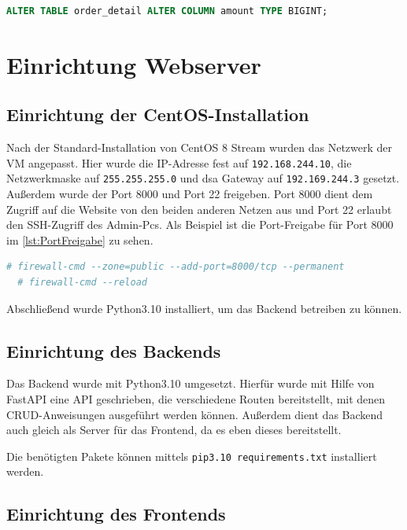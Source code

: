 \documentclass[a4paper,
    11pt,
    headings=small,
    ngerman,
    listof=totoc,
    numbers=noenddot]{scrreprt}[2021/11/13]
\begin{document}
\begin{lstlisting}[language=SQL,caption={Ändern der tickets-Tabelle},label={lst:AlterSQL}]
  ALTER TABLE order_detail ALTER COLUMN amount TYPE BIGINT;
\end{lstlisting}



\newpage
\section{Einrichtung Webserver}


\subsection{Einrichtung der CentOS-Installation}

Nach der Standard-Installation von CentOS 8 Stream wurden das Netzwerk der \ac{VM} angepasst. Hier wurde die IP-Adresse fest auf \texttt{192.168.244.10}, die Netzwerkmaske auf \texttt{255.255.255.0} und dsa Gateway auf \texttt{192.169.244.3} gesetzt. Außerdem wurde der Port 8000 und Port 22 freigeben. Port 8000 dient dem Zugriff auf die Website von den beiden anderen Netzen aus und Port 22 erlaubt den SSH-Zugriff des Admin-Pcs. Als Beispiel ist die Port-Freigabe für Port 8000 im \vref{lst:PortFreigabe} zu sehen.

\begin{lstlisting}[language=bash,caption={Port-Freigabe einer CentOS-Firewall},label={lst:PortFreigabe}]
  # firewall-cmd --zone=public --add-port=8000/tcp --permanent
  # firewall-cmd --reload
\end{lstlisting}

Abschließend wurde Python3.10 installiert, um das Backend betreiben zu können.


\subsection{Einrichtung des Backends}

Das Backend wurde mit Python3.10 umgesetzt. Hierfür wurde mit Hilfe von FastAPI eine \ac{API} geschrieben, die verschiedene Routen bereitstellt, mit denen \ac{CRUD}-Anweisungen ausgeführt werden können. Außerdem dient das Backend auch gleich als Server für das Frontend, da es eben dieses bereitstellt.

Die benötigten Pakete können mittels \texttt{pip3.10 requirements.txt} installiert werden.


\subsection{Einrichtung des Frontends}
\end{document}
